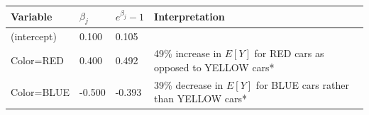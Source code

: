 \documentclass[openany]{book}
\begin{document}
\begin{longtable}[]{@{}llll@{}}
\toprule
\begin{minipage}[b]{0.11\columnwidth}\raggedright
Variable\strut
\end{minipage} & \begin{minipage}[b]{0.11\columnwidth}\raggedright
\(\beta_j\)\strut
\end{minipage} & \begin{minipage}[b]{0.19\columnwidth}\raggedright
\(e^{\beta_j} - 1\)\strut
\end{minipage} & \begin{minipage}[b]{0.48\columnwidth}\raggedright
Interpretation\strut
\end{minipage}\tabularnewline
\midrule
\endhead
\begin{minipage}[t]{0.11\columnwidth}\raggedright
(intercept)\strut
\end{minipage} & \begin{minipage}[t]{0.11\columnwidth}\raggedright
0.100\strut
\end{minipage} & \begin{minipage}[t]{0.19\columnwidth}\raggedright
0.105\strut
\end{minipage} & \begin{minipage}[t]{0.48\columnwidth}\raggedright
\strut
\end{minipage}\tabularnewline
\begin{minipage}[t]{0.11\columnwidth}\raggedright
Color=RED\strut
\end{minipage} & \begin{minipage}[t]{0.11\columnwidth}\raggedright
0.400\strut
\end{minipage} & \begin{minipage}[t]{0.19\columnwidth}\raggedright
0.492\strut
\end{minipage} & \begin{minipage}[t]{0.48\columnwidth}\raggedright
49\% increase in \(E[Y]\) for RED cars as opposed to YELLOW cars*\strut
\end{minipage}\tabularnewline
\begin{minipage}[t]{0.11\columnwidth}\raggedright
Color=BLUE\strut
\end{minipage} & \begin{minipage}[t]{0.11\columnwidth}\raggedright
-0.500\strut
\end{minipage} & \begin{minipage}[t]{0.19\columnwidth}\raggedright
-0.393\strut
\end{minipage} & \begin{minipage}[t]{0.48\columnwidth}\raggedright
39\% decrease in \(E[Y]\) for BLUE cars rather than YELLOW cars*\strut
\end{minipage}\tabularnewline
\bottomrule
\end{longtable}
\end{document}
